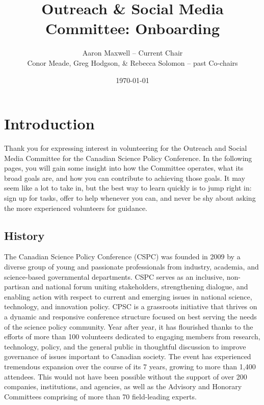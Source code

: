 \documentclass[11pt]{amsart}
\title{Outreach \& Social Media Committee: Onboarding}
\author{Aaron Maxwell -- Current Chair \\ Conor Meade, Greg Hodgson, \& Rebecca Solomon -- past Co-chairs}
\date{\today}
\begin{document}
\maketitle
\section{Introduction}
Thank you for expressing interest in volunteering for the Outreach and Social Media Committee for the Canadian Science Policy Conference.
In the following pages, you will gain some insight into how the Committee operates, what its broad goals are, and how you can contribute to achieving those goals.
It may seem like a lot to take in, but the best way to learn quickly is to jump right in: sign up for tasks, offer to help whenever you can, and never be shy about asking the more experienced volunteers for guidance.
\subsection{History}
The Canadian Science Policy Conference (CSPC) was founded in 2009 by a diverse group of young and passionate professionals from industry, academia, and science-based governmental departments.
CSPC serves as an inclusive, non-partisan and national forum uniting stakeholders, strengthening dialogue, and enabling action with respect to current and emerging issues in national science, technology, and innovation policy.
CPSC is a grassroots initiative that thrives on a dynamic and responsive conference structure focused on best serving the needs of the science policy community.
Year after year, it has flourished thanks to the efforts of more than 100 volunteers dedicated to engaging members from research, technology, policy, and the general public in thoughtful discussion to improve governance of issues important to Canadian society.
The event has experienced tremendous expansion over the course of its 7 years, growing to more than 1,400 attendees.
This would not have been possible without the support of over 200 companies, institutions, and agencies, as well as the Advisory and Honorary Committees comprising of more than 70 field-leading experts.
\end{document}
